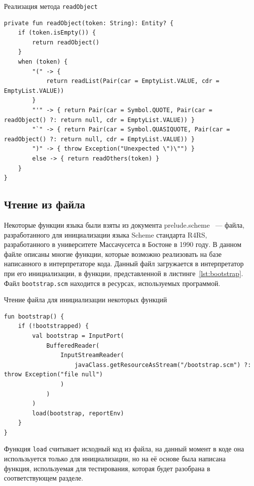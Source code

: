 \documentclass[14pt, russian]{scrartcl}
\begin{document}
\begin{listing}[!htb]
\caption{Реализация метода \texttt{readObject}}
\label{lst:readobject}
\begin{verbatim}
private fun readObject(token: String): Entity? {
    if (token.isEmpty()) {
        return readObject()
    }
    when (token) {
        "(" -> {
            return readList(Pair(car = EmptyList.VALUE, cdr = EmptyList.VALUE))
        }
        "'" -> { return Pair(car = Symbol.QUOTE, Pair(car = readObject() ?: return null, cdr = EmptyList.VALUE)) }
        "`" -> { return Pair(car = Symbol.QUASIQUOTE, Pair(car = readObject() ?: return null, cdr = EmptyList.VALUE)) }
        ")" -> { throw Exception("Unexpected \")\"") }
        else -> { return readOthers(token) }
    }
}
\end{verbatim}
\end{listing}

\subsection{Чтение из файла}

Некоторые функции языка были взяты из документа prelude.scheme~\cite{UMBScheme} --- файла, разработанного для инициализации языка Scheme стандарта R4RS, разработанного в университете Массачусетса в Бостоне в 1990 году. В данном файле описаны многие функции, которые возможно реализовать на базе написанного в интерпретаторе кода. Данный файл загружается в интерпретатор при его инициализации, в функции, представленной в листинге~\ref{lst:bootstrap}. Файл \texttt{bootstrap.scm} находится в ресурсах, используемых программой.

\begin{listing}[!htb]
\caption{Чтение файла для инициализации некоторых функций}
\label{lst:bootstrap}
\begin{verbatim}
fun bootstrap() {
    if (!bootstrapped) {
        val bootstrap = InputPort(
            BufferedReader(
                InputStreamReader(
                    javaClass.getResourceAsStream("/bootstrap.scm") ?: throw Exception("file null")
                )
            )
        )
        load(bootstrap, reportEnv)
    }
}
\end{verbatim}
\end{listing}

Функция \texttt{load} считывает исходный код из файла, на данный момент в коде она использьуется только для инициализации, но на её основе была написана функция, используемая для тестирования, которая будет разобрана в соответствующем разделе.
\end{document}
